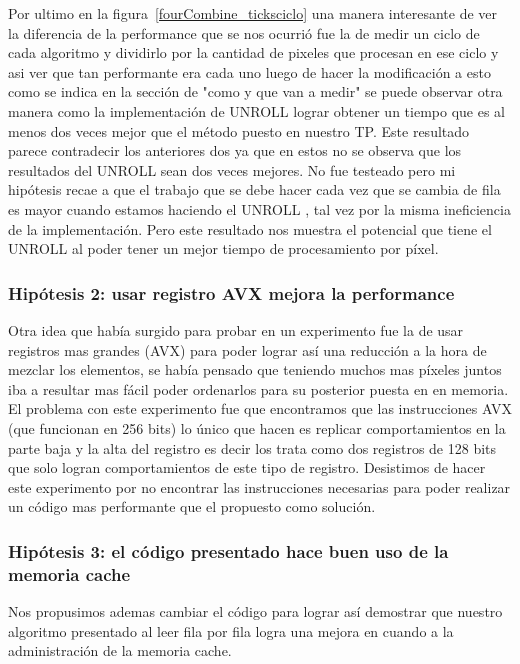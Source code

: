 Por ultimo en la figura~\ref{fourCombine_ticksciclo} una manera interesante de ver la diferencia de la performance que se nos ocurrió fue la de medir un ciclo de cada algoritmo y dividirlo por la cantidad de pixeles que procesan en ese ciclo y asi ver que tan performante era cada uno luego de hacer la modificación a esto como se indica en la sección de "como y que van a medir" se puede observar otra manera como la implementación de UNROLL lograr obtener un tiempo que es al menos dos veces mejor que el método puesto en nuestro TP. Este resultado parece contradecir los anteriores dos ya que en estos no se observa que los resultados del UNROLL sean dos veces mejores. No fue testeado pero mi hipótesis recae a que el trabajo que se debe hacer cada vez que se cambia de fila es mayor cuando estamos haciendo el UNROLL , tal vez por la misma ineficiencia de la implementación. Pero este resultado nos muestra el potencial que tiene el UNROLL al poder tener un mejor tiempo de procesamiento por píxel.


\subsubsection*{Hipótesis 2: usar registro AVX mejora la performance}
Otra idea que había surgido para probar en un experimento fue la de usar registros mas grandes (AVX) para poder lograr así una reducción a la hora de mezclar los elementos, se había pensado que teniendo muchos mas píxeles juntos iba a resultar mas fácil poder ordenarlos para su posterior puesta en en memoria. El problema con este experimento fue que encontramos que las instrucciones AVX (que funcionan en 256 bits) lo único que hacen es replicar comportamientos en la parte baja y la alta del registro es decir los trata como dos registros de 128 bits que solo logran comportamientos de este tipo de registro. Desistimos de hacer este experimento por no encontrar las instrucciones necesarias para poder realizar un código mas performante que el propuesto como solución.

\subsubsection*{Hipótesis 3: el código presentado hace buen uso de la memoria cache}
Nos propusimos ademas cambiar el código para lograr así demostrar que nuestro algoritmo presentado al leer fila por fila logra una mejora en cuando a la administración de la memoria cache. 

